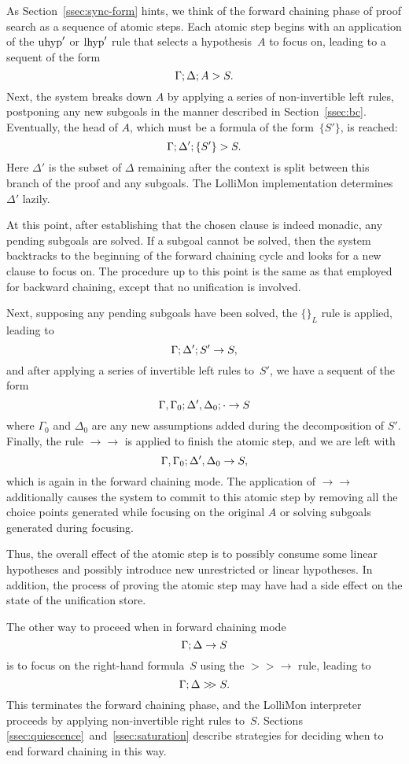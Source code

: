 \documentclass{sig-alt}
\begin{document}
As Section~\ref{ssec:sync-form} hints, we think of the forward
chaining phase of proof search as a sequence of atomic steps.  Each
atomic step begins with an application of the $\hbox{uhyp}'$ or
$\hbox{lhyp}'$ rule that selects a hypothesis~$A$ to focus on, leading to
a sequent of the form
$$
  \Gamma;\Delta;A\mathrel>S.
$$
%
Next, the system breaks down $A$ by applying a series of non-invertible
left rules, postponing any new subgoals in the manner described in
Section~\ref{ssec:bc}.  Eventually, the head of $A$, which
must be a formula of the form~$\{S'\}$, is reached:
$$
\Gamma;\Delta';\{S'\}\mathrel>S.
$$
%
Here $\Delta'$ is the subset of $\Delta$ remaining after the
context is split between this branch of the proof and any subgoals.
The LolliMon implementation determines $\Delta'$ lazily.

At this point, after establishing that the chosen clause is indeed
monadic, any pending subgoals are solved.  If a
subgoal cannot be solved, then the system backtracks to the beginning
of the forward chaining cycle and looks for a new clause to focus on.
The procedure up to this point is the same as that
employed for backward chaining, except that no unification is involved.

Next, supposing any pending subgoals have been solved, the $\{\}_L$ rule is applied, leading to
$$
  \Gamma;\Delta';S'\rightarrow S,
$$
and after applying a series of invertible left rules to~$S'$, we
have a sequent of the form
$$
  \Gamma,\Gamma_0;\Delta',\Delta_0;\cdot\rightarrow S
$$
%
where $\Gamma_0$ and $\Delta_0$ are any new assumptions added during the
decomposition of $S'$.  Finally, the rule $\rightarrow\rightarrow$ is
applied to finish the atomic step, and we are left with
$$
\Gamma,\Gamma_0;\Delta',\Delta_0\rightarrow S,
$$
%
which is again in the forward chaining mode.  The application of
$\rightarrow\rightarrow$ additionally causes the system to commit to
this atomic step by removing all the choice points generated while
focusing on the original $A$ or solving subgoals generated during focusing.

Thus, the overall effect of the atomic step is to possibly consume some
linear hypotheses and possibly introduce new unrestricted or linear
hypotheses. In addition, the process of proving the atomic step may
have had a side effect on the state of the unification store.

The other way to proceed when in forward chaining mode
$$
  \Gamma;\Delta\rightarrow S
$$
is to focus on the right-hand formula~$S$ using the $>\!\!>\rightarrow$ rule,
leading to
$$
  \Gamma;\Delta\mathrel{>\!\! >}S.
$$ 
%
This terminates the forward chaining phase, and the LolliMon
interpreter proceeds by applying non-invertible right rules to~$S$.
Sections \ref{ssec:quiescence}~and~\ref{ssec:saturation} describe
strategies for
deciding when to end forward chaining in this way.
\end{document}
